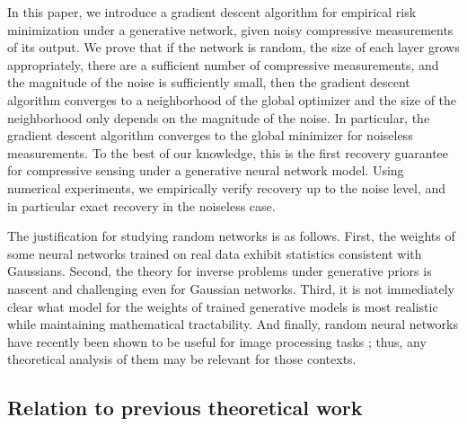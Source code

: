 
In this paper, we introduce a gradient descent algorithm for empirical risk minimization under a generative network, given noisy compressive measurements of its output.  We prove that if the network is random, the size of each layer grows appropriately, there are a sufficient number of compressive measurements, and the magnitude of the noise is sufficiently small, then the gradient descent algorithm converges to a neighborhood of the global optimizer and the size of the neighborhood only depends on the magnitude of the noise. In particular, the gradient descent algorithm converges to the global minimizer for noiseless measurements.  To the best of our knowledge, this is the first recovery guarantee for compressive sensing under a generative neural network model. Using numerical experiments, we empirically verify recovery up to the noise level, and in particular exact recovery in the noiseless case.

The justification for studying random networks is as follows.  First, the weights of some neural networks trained on real data exhibit statistics consistent with Gaussians.  Second, the theory for inverse problems under generative priors is nascent and challenging even for Gaussian networks.  Third, it is not immediately clear what model for the weights of trained generative models is most realistic while maintaining mathematical tractability.  And finally, random neural networks have recently been shown to be useful for image processing tasks \cite{ulyanov2017deep,heckel2018deep}; thus, any theoretical analysis of them may be relevant for those contexts.

\subsection{Relation to previous theoretical work}

